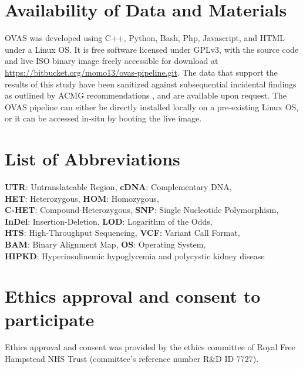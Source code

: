 \documentclass[twocolumn]{bmcart}%
\def\app{OVAS}
\begin{document}

\begin{backmatter}

\section*{Availability of Data and Materials}
\app{} was developed using C++, Python, Bash, Php, Javascript, and HTML under a Linux OS. It is free software licensed under GPLv3, with the source code and live ISO binary image freely accessible for download at \url{https://bitbucket.org/momo13/ovas-pipeline.git}. The data that support the results of this study have been sanitized against subsequential incidental findings as outlined by ACMG recommendations \cite{kalia2016recommendations}, and are available upon request. The \app{} pipeline can either be directly installed locally on a pre-existing Linux OS, or it can be accessed in-situ by booting the live image.


\section*{List of Abbreviations}
\textbf{UTR}:  Untranslateable Region, \textbf{cDNA}: Complementary DNA,\\
\textbf{HET}: Heterozygous, \textbf{HOM}: Homozygous,\\
\textbf{C-HET}: Compound-Heterozygous, \textbf{SNP}: Single Nucleotide Polymorphism,\\
\textbf{InDel}: Insertion-Deletion, \textbf{LOD}: Logarithm of the Odds,\\
\textbf{HTS}: High-Throughput Sequencing, \textbf{VCF}: Variant Call Format,\\
\textbf{BAM}: Binary Alignment Map, \textbf{OS}: Operating System,\\
\textbf{HIPKD}: Hyperinsulinemic hypoglycemia and polycystic kidney disease



\section*{Ethics approval and consent to participate}
Ethics approval and consent was provided by the ethics committee of Royal Free Hampstead NHS Trust (committee's reference number R\&D ID 7727).


\end{backmatter}
\end{document}

